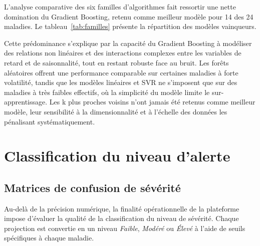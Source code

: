 L'analyse comparative des six familles d'algorithmes fait ressortir une nette
domination du Gradient Boosting, retenu comme meilleur modèle pour 14 des
24 maladies. Le tableau~\ref{tab:familles} présente la répartition des modèles
vainqueurs.

\begin{table}[htbp]
  \centering
  \caption{Répartition du meilleur algorithme par maladie.}
  \label{tab:familles}
\end{table}

Cette prédominance s'explique par la capacité du Gradient Boosting à modéliser des
relations non linéaires et des interactions complexes entre les variables de retard
et de saisonnalité, tout en restant robuste face au bruit. Les forêts aléatoires
offrent une performance comparable sur certaines maladies à forte volatilité, tandis
que les modèles linéaires et SVR ne s'imposent que sur des maladies à très faibles
effectifs, où la simplicité du modèle limite le sur-apprentissage. Les k plus
proches voisins n'ont jamais été retenus comme meilleur modèle, leur sensibilité à
la dimensionnalité et à l'échelle des données les pénalisant systématiquement.

\section{Classification du niveau d'alerte}

\subsection{Matrices de confusion de sévérité}

Au-delà de la précision numérique, la finalité opérationnelle de la plateforme
impose d'évaluer la qualité de la classification du niveau de sévérité. Chaque
projection est convertie en un niveau \textit{Faible}, \textit{Modéré} ou
\textit{Élevé} à l'aide de seuils spécifiques à chaque maladie.

